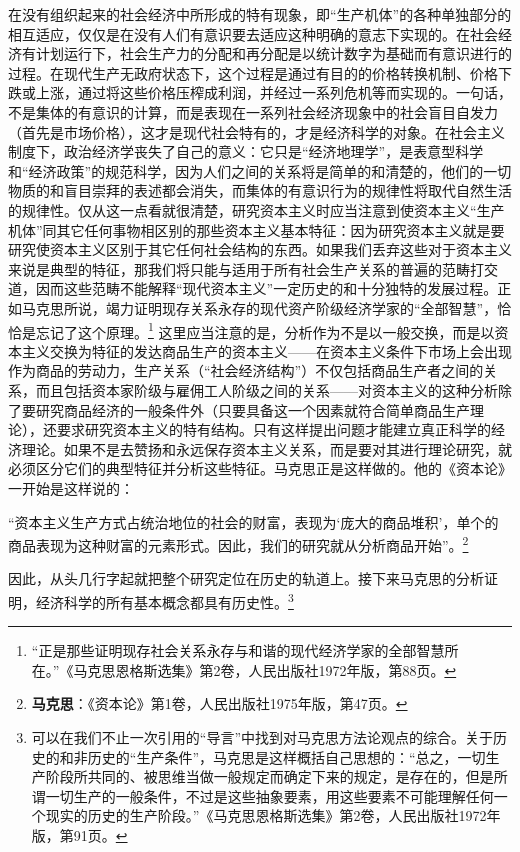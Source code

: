 \documentclass[fontset=fandol, a4paper, 12pt, openright]{ctexbook}
\begin{document}
在没有组织起来的社会经济中所形成的特有现象，即“生产机体”的各种单独部分的相互适应，仅仅是在没有人们有意识要去适应这种明确的意志下实现的。在社会经济有计划运行下，社会生产力的分配和再分配是以统计数字为基础而有意识进行的过程。在现代生产无政府状态下，这个过程是通过有目的的价格转换机制、价格下跌或上涨，通过将这些价格压榨成利润，并经过一系列危机等而实现的。一句话，不是集体的有意识的计算，而是表现在一系列社会经济现象中的社会盲目自发力（首先是市场价格），这才是现代社会特有的，才是经济科学的对象。在社会主义制度下，政治经济学丧失了自己的意义：它只是“经济地理学”，是表意型科学和“经济政策”的规范科学，因为人们之间的关系将是简单的和清楚的，他们的一切物质的和盲目崇拜的表述都会消失，而集体的有意识行为的规律性将取代自然生活的规律性。仅从这一点看就很清楚，研究资本主义时应当注意到使资本主义“生产机体”同其它任何事物相区别的那些资本主义基本特征：因为研究资本主义就是要研究使资本主义区别于其它任何社会结构的东西。如果我们丢弃这些对于资本主义来说是典型的特征，那我们将只能与适用于所有社会生产关系的普遍的范畴打交道，因而这些范畴不能解释“现代资本主义”一定历史的和十分独特的发展过程。正如马克思所说，竭力证明现存关系永存的现代资产阶级经济学家的“全部智慧”，恰恰是忘记了这个原理。\footnote{“正是那些证明现存社会关系永存与和谐的现代经济学家的全部智慧所在。”《马克思恩格斯选集》第2卷，人民出版社1972年版，第88页。} 这里应当注意的是，分析作为不是以一般交换，而是以资本主义交换为特征的发达商品生产的资本主义——在资本主义条件下市场上会出现作为商品的劳动力，生产关系（“社会经济结构”）不仅包括商品生产者之间的关系，而且包括资本家阶级与雇佣工人阶级之间的关系——对资本主义的这种分析除了要研究商品经济的一般条件外（只要具备这一个因素就符合简单商品生产理论），还要求研究资本主义的特有结构。只有这样提出问题才能建立真正科学的经济理论。如果不是去赞扬和永远保存资本主义关系，而是要对其进行理论研究，就必须区分它们的典型特征并分析这些特征。马克思正是这样做的。他的《资本论》一开始是这样说的：

“资本主义生产方式占统治地位的社会的财富，表现为‘庞大的商品堆积’，单个的商品表现为这种财富的元素形式。因此，我们的研究就从分析商品开始”。\footnote{\textbf{马克思}：《资本论》第1卷，人民出版社1975年版，第47页。}

因此，从头几行字起就把整个研究定位在历史的轨道上。接下来马克思的分析证明，经济科学的所有基本概念都具有历史性。\footnote{可以在我们不止一次引用的“导言”中找到对马克思方法论观点的综合。关于历史的和非历史的“生产条件”，马克思是这样概括自己思想的：“总之，一切生产阶段所共同的、被思维当做一般规定而确定下来的规定，是存在的，但是所谓一切生产的一般条件，不过是这些抽象要素，用这些要素不可能理解任何一个现实的历史的生产阶段。”《马克思恩格斯选集》第2卷，人民出版社1972年版，第91页。}
\end{document}
